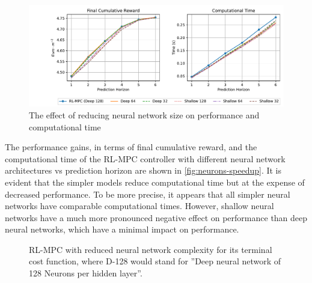 \begin{figure}[H]
	\centering
	\includegraphics[width=\textwidth]{figures/speed_up_neurons.pdf}
	\caption{The effect of reducing neural network size on performance and computational time}
	\label{fig:neurons-speedup}
\end{figure}

The performance gains, in terms of final cumulative reward, and the computational time of the RL-MPC controller with different neural network architectures vs prediction horizon are shown in \autoref{fig:neurons-speedup}. It is evident that the simpler models reduce computational time but at the expense of decreased performance. To be more precise, it appears that all simpler neural networks have comparable computational times. However, shallow neural networks have a much more pronounced negative effect on performance than deep neural networks, which have a minimal impact on performance.

\begin{figure}[H]
	\centering
	\caption{RL-MPC with reduced neural network complexity for its terminal cost function, where D-128 would stand for ''Deep neural network of 128 Neurons per hidden layer''.}
	\label{fig:neurons-speedup-bar-graph}
\end{figure}

